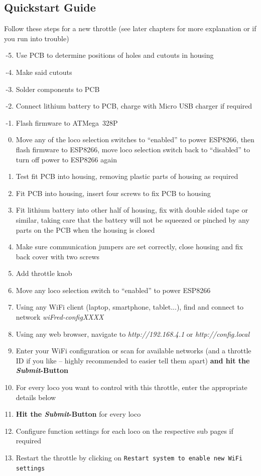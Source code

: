 \documentclass[11pt,a4paper]{scrartcl}
\begin{document}
\subsection{Quickstart Guide}

Follow these steps for a new throttle (see later chapters for more explanation or if you run into trouble)

\begin{enumerate}
\setcounter{enumi}{-6}
\item Use PCB to determine positions of holes and cutouts in housing
\item Make said cutouts
\item Solder components to PCB
\item Connect lithium battery to PCB, charge with Micro USB charger if required
\item Flash firmware to ATMega~328P
\item Move any of the loco selection switches to ``enabled'' to power ESP8266, then flash firmware to ESP8266, move loco selection switch back to ``disabled'' to turn off power to ESP8266 again
\item Test fit PCB into housing, removing plastic parts of housing as required
\item Fit PCB into housing, insert four screws to fix PCB to housing
\item Fit lithium battery into other half of housing, fix with double sided tape or similar, taking care that the battery will not be squeezed or pinched by any parts on the PCB when the housing is closed
\item Make sure communication jumpers are set correctly, close housing and fix back cover with two screws
\item Add throttle knob
\item Move any loco selection switch to ``enabled'' to power ESP8266
\item Using any WiFi client (laptop, smartphone, tablet...), find and connect to network \textit{wiFred-configXXXX}
\item Using any web browser, navigate to \textit{http://192.168.4.1} or \textit{http://config.local}
\item Enter your WiFi configuration or scan for available networks (and a throttle ID if you like -- highly recommended to easier tell them apart) \textbf{and hit the \textit{Submit}-Button}
\item For every loco you want to control with this throttle, enter the appropriate details below
\item \textbf{Hit the \textit{Submit}-Button} for every loco
\item Configure function settings for each loco on the respective sub pages if required
\item Restart the throttle by clicking on \texttt{Restart system to enable new WiFi settings}
\end{enumerate}
\end{document}
